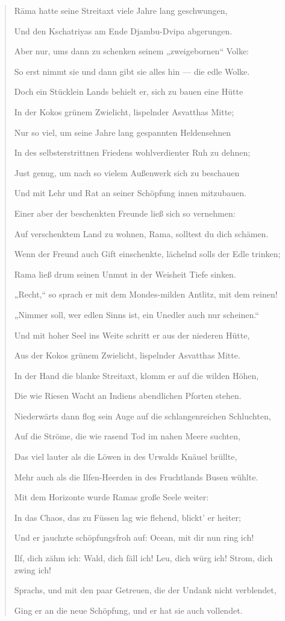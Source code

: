 \documentclass{article}
\begin{document}
\begin{quotation}\small
R\={a}ma hatte seine Streitaxt viele Jahre lang geschwungen,

Und den Kschatriyas am Ende Djambu-Dvipa abgerungen.

Aber nur, ums dann zu schenken seinem „zweigebornen“ Volke:

So erst nimmt sie und dann gibt sie alles hin — die edle Wolke.

Doch ein Stücklein Lands behielt er, sich zu bauen eine Hütte

In der Kokos grünem Zwielicht, lispelnder Asvatthas Mitte;

Nur so viel, um seine Jahre lang gespannten Heldensehnen

In des selbsterstrittnen Friedens wohlverdienter Ruh zu dehnen;

Just genug, um nach so vielem Außenwerk sich zu beschauen

Und mit Lehr und Rat an seiner Schöpfung innen mitzubauen.

Einer aber der beschenkten Freunde ließ sich so vernehmen:

Auf verschenktem Land zu wohnen, Rama, solltest du dich schämen.

Wenn der Freund auch Gift einschenkte, lächelnd solls der Edle trinken;

Rama ließ drum seinen Unmut in der Weisheit Tiefe sinken.

„Recht,“ so sprach er mit dem Mondes-milden Antlitz, mit dem reinen!

„Nimmer soll, wer edlen Sinns ist, ein Unedler auch nur scheinen.“

Und mit hoher Seel ins Weite schritt er aus der niederen Hütte,

Aus der Kokos grünem Zwielicht, lispelnder Asvatthas Mitte.

In der Hand die blanke Streitaxt, klomm er auf die wilden Höhen,

Die wie Riesen Wacht an Indiens abendlichen Pforten stehen.

Niederwärts dann flog sein Auge auf die schlangenreichen Schluchten, 

Auf die Ströme, die wie rasend Tod im nahen Meere suchten,

Das viel lauter als die Löwen in des Urwalds Knäuel brüllte,

Mehr auch als die Ilfen-Heerden in des Fruchtlands Busen wühlte.

Mit dem Horizonte wurde Ramas große Seele weiter:

In das Chaos, das zu Füssen lag wie flehend, blickt' er heiter;

Und er jauchzte schöpfungsfroh auf: Ocean, mit dir nun ring ich!

Ilf, dich zähm ich: Wald, dich fäll ich! Leu, dich würg ich! Strom, dich zwing ich!

Sprachs, und mit den paar Getreuen, die der Undank nicht verblendet,

Ging er an die neue Schöpfung, und er hat sie auch vollendet.
\end{quotation}
\end{document}
